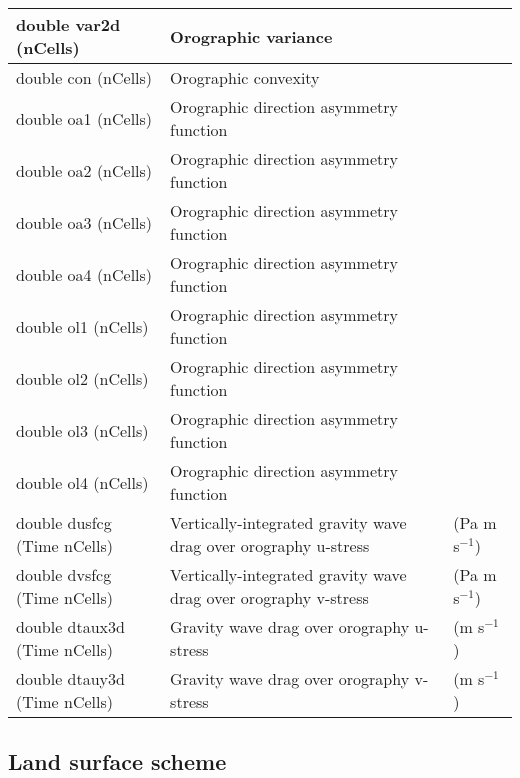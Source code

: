{\small
\begin{longtable}{|p{2.0in} |p{3.0in} |p{1.0in} |}
\hline
double var2d (nCells) & Orographic variance & \\ \hline
double con (nCells) & Orographic convexity & \\ \hline
double oa1 (nCells) & Orographic direction asymmetry function & \\ \hline
double oa2 (nCells) & Orographic direction asymmetry function & \\ \hline
double oa3 (nCells) & Orographic direction asymmetry function & \\ \hline
double oa4 (nCells) & Orographic direction asymmetry function & \\ \hline
double ol1 (nCells) & Orographic direction asymmetry function & \\ \hline
double ol2 (nCells) & Orographic direction asymmetry function & \\ \hline
double ol3 (nCells) & Orographic direction asymmetry function & \\ \hline
double ol4 (nCells) & Orographic direction asymmetry function & \\ \hline
double dusfcg (Time nCells) & Vertically-integrated gravity wave drag over orography u-stress & (Pa m s$^{-1}$) \\ \hline
double dvsfcg (Time nCells) & Vertically-integrated gravity wave drag over orography v-stress & (Pa m s$^{-1}$) \\ \hline
double dtaux3d (Time nCells) & Gravity wave drag over orography u-stress & (m s$^{-1}$) \\ \hline
double dtauy3d (Time nCells) & Gravity wave drag over orography v-stress & (m s$^{-1}$) \\ \hline
\end{longtable}
}

\subsection{Land surface scheme}

